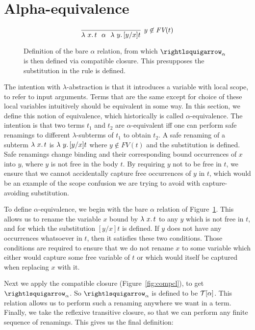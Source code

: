   

\section{Alpha-equivalence}
\label{sec:alpha}

\begin{figure}
  \[
   \infer[y\not\in\textit{FV}(t)]{\lam{x}{t}\ \ \alpha\ \ \lam{y}{[y/x]t}}{\ }
  \]

  \caption{Definition of the bare $\alpha$ relation, from which $\curva_\alpha$ is then defined
    via compatible closure.  This presupposes the substitution in the rule is defined.}
\label{fig:barealpha}
\end{figure}

The intention with $\lambda$-abstraction is that it introduces a
variable with local scope, to refer to input arguments.  Terms that
are the same except for choice of these local variables intuitively
should be equivalent in some way.  In this section, we define this
notion of equivalence, which historically is called
$\alpha$-equivalence.  The intention is
that two terms $t_1$ and $t_2$ are $\alpha$-equivalent iff one can
perform safe renamings to different $\lambda$-subterms of $t_1$ to
obtain $t_2$.  A safe renaming of a subterm $\lambda\ x.\, t$ is
$\lambda\ y.\, [y/x]t$ where $y\not\in\textit{FV}(t)$ and the substitution
is defined.  Safe renamings
change binding and their corresponding bound occurrences of $x$ into
$y$, where $y$ is not free in the body $t$.  By requiring $y$ not to
be free in $t$, we ensure that we cannot accidentally capture free
occurrences of $y$ in $t$, which would be an example of the scope
confusion we are trying to avoid with capture-avoiding substitution.

To define $\alpha$-equivalence, we begin with the bare $\alpha$
relation of Figure~\ref{fig:barealpha}.  This allows us to rename the
variable $x$ bound by $\lambda\ x.\, t$ to any $y$ which is not free in
$t$, and for which the substitution $[y/x] t$ is defined.  If $y$ does
not have any occurrences whatsoever in $t$, then it satisfies these
two conditions.  Those conditions are required to ensure that we do
not rename $x$ to some variable which either would capture some free
variable of $t$ or which would itself be captured when replacing $x$
with it.

Next we apply the compatible closure (Figure~\ref{fig:compcl}), to get
$\curva_\alpha$.  So $\curva_\alpha$ is defined to be $\mathcal{T}[\alpha]$.
This relation allows us to perform such a renaming anywhere we want in
a term.  Finally, we take the reflexive transitive closure, so that we
can perform any finite sequence of renamings.  This gives us the final
definition:

